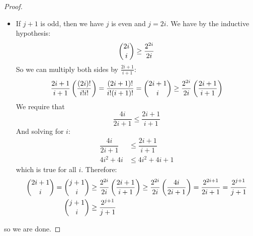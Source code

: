 \documentclass{article}
\begin{document}
\begin{proof}
\begin{itemize}
                \item If $j + 1$ is odd, then we have $j$ is even and $j = 2i$. We have by the inductive hypothesis:
                    \begin{equation*}
                        \dbinom{2i}{i} \geq \dfrac{2^{2i}}{2i}
                    \end{equation*}
                So we can multiply both sides by $\frac{2i + 1}{i + 1}$:
                    \begin{align*}
                        \dfrac{2i + 1}{i + 1}\left(\dfrac{(2i)!}{i!i!}\right) = \dfrac{(2i + 1)!}{i!(i + 1)!} = \dbinom{2i + 1}{i} \geq \dfrac{2^{2i}}{2i}\left(\dfrac{2i + 1}{i + 1}\right)
                    \end{align*}
                We require that 
                    \begin{equation*}
                        \dfrac{4i}{2i + 1} \leq \dfrac{2i + 1}{i + 1}
                    \end{equation*}
                And solving for $i$:
                    \begin{align*}
                        \dfrac{4i}{2i + 1} &\leq  \dfrac{2i + 1}{i + 1} \\
                        4i^{2} + 4i        &\leq  4i^{2} + 4i + 1         
                    \end{align*}
                which is true for all $i$. Therefore:
                    \begin{align*}
                        \dbinom{2i + 1}{i} = \dbinom{j + 1}{i} &\geq \dfrac{2^{2i}}{2i}\left(\dfrac{2i + 1}{i + 1}\right) \geq \dfrac{2^{2i}}{2i}\left(\dfrac{4i}{2i + 1}\right) = \dfrac{2^{2i + 1}}{2i + 1} = \dfrac{2^{j + 1}}{j + 1} \\
                        \dbinom{j + 1}{i} &\geq \dfrac{2^{j + 1}}{j + 1}
                    \end{align*}
            \end{itemize}
        so we are done.
    \end{proof}
\end{document}
